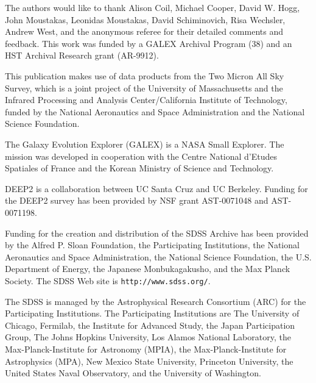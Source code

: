 \documentclass[10pt,preprint]{aastex}
\begin{document}

\acknowledgments

The authors would like to thank Alison Coil, Michael Cooper, David
W. Hogg, John Moustakas, Leonidas Moustakas, David Schiminovich, Risa
Wechsler, Andrew West, and the anonymous referee for their detailed comments and
feedback. This work was funded by a GALEX Archival Program (38) and an
HST Archival Research grant (AR-9912).

This publication makes use of data products from the Two Micron All
Sky Survey, which is a joint project of the University of
Massachusetts and the Infrared Processing and Analysis
Center/California Institute of Technology, funded by the National
Aeronautics and Space Administration and the National Science
Foundation.

The Galaxy Evolution Explorer (GALEX) is a NASA Small Explorer. The
mission was developed in cooperation with the Centre National d'Etudes
Spatiales of France and the Korean Ministry of Science and Technology.

DEEP2 is a collaboration between UC Santa Cruz and UC Berkeley.
Funding for the DEEP2 survey has been provided by NSF grant
AST-0071048 and AST-0071198.

Funding for the creation and distribution of the SDSS Archive has been
provided by the Alfred P. Sloan Foundation, the Participating
Institutions, the National Aeronautics and Space Administration, the
National Science Foundation, the U.S. Department of Energy, the
Japanese Monbukagakusho, and the Max Planck Society. The SDSS Web site
is {\tt http://www.sdss.org/}.

The SDSS is managed by the Astrophysical Research Consortium (ARC) for
the Participating Institutions. The Participating Institutions are The
University of Chicago, Fermilab, the Institute for Advanced Study, the
Japan Participation Group, The Johns Hopkins University, Los Alamos
National Laboratory, the Max-Planck-Institute for Astronomy (MPIA),
the Max-Planck-Institute for Astrophysics (MPA), New Mexico State
University, Princeton University, the United States Naval Observatory,
and the University of Washington.
 
\end{document}
